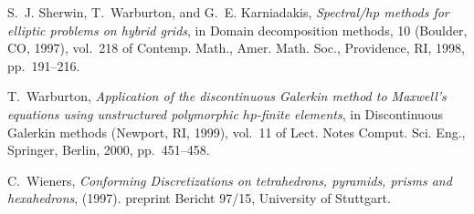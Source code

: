\documentclass[twoside,reqno,final]{amsart}
\begin{document}
\begin{thebibliography}{10}
{\sc S.~J. Sherwin, T.~Warburton, and G.~E. Karniadakis}, {\em Spectral/{$hp$}
  methods for elliptic problems on hybrid grids}, in Domain decomposition
  methods, 10 ({B}oulder, {CO}, 1997), vol.~218 of Contemp. Math., Amer. Math.
  Soc., Providence, RI, 1998, pp.~191--216.

{\sc T.~Warburton}, {\em Application of the discontinuous {G}alerkin method to
  {M}axwell's equations using unstructured polymorphic {$hp$}-finite elements},
  in Discontinuous {G}alerkin methods ({N}ewport, {RI}, 1999), vol.~11 of Lect.
  Notes Comput. Sci. Eng., Springer, Berlin, 2000, pp.~451--458.

{\sc C.~Wieners}, {\em Conforming {D}iscretizations on tetrahedrons, pyramids,
  prisms and hexahedrons},  (1997).
\newblock preprint Bericht 97/15, University of Stuttgart.

\end{thebibliography}
\end{document}
